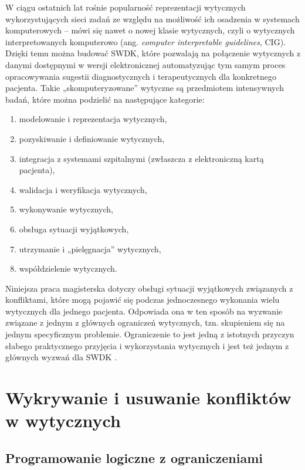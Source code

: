 W ciągu ostatnich lat rośnie popularność reprezentacji wytycznych wykorzystujących sieci zadań ze względu na możliwość ich osadzenia w systemach komputerowych -- mówi się nawet o nowej klasie wytycznych, czyli o wytycznych interpretowanych komputerowo (ang. \textit{computer interpretable guidelines}, CIG). Dzięki temu można budować SWDK, które pozwalają na połączenie wytycznych z danymi dostępnymi w wersji elektronicznej automatyzując tym samym proces opracowywania sugestii diagnostycznych i terapeutycznych dla konkretnego pacjenta. Takie „skomputeryzowane” wytyczne są przedmiotem intensywnych badań, które można podzielić na następujące kategorie:
\begin{enumerate}
\item modelowanie i reprezentacja wytycznych,
\item pozyskiwanie i definiowanie wytycznych,
\item integracja z systemami szpitalnymi (zwłaszcza z elektroniczną kartą pacjenta),
\item walidacja i weryfikacja wytycznych,
\item wykonywanie wytycznych,
\item obsługa sytuacji wyjątkowych,
\item utrzymanie i „pielęgnacja” wytycznych,
\item współdzielenie wytycznych.
\end{enumerate}

Niniejsza praca magisterska dotyczy obsługi sytuacji wyjątkowych związanych z konfliktami, które mogą pojawić się podczas jednoczesnego wykonania wielu wytycznych dla jednego pacjenta. Odpowiada ona w ten sposób na wyzwanie związane z jednym z głównych ograniczeń wytycznych, tzn. skupieniem się na jednym specyficznym problemie. Ograniczenie to jest jedną z istotnych przyczyn słabego praktycznego przyjęcia i wykorzystania wytycznych i jest też jednym z głównych wyzwań dla SWDK \cite{Sittig08}.

\section{Wykrywanie i usuwanie konfliktów w wytycznych}

\subsection{Programowanie logiczne z ograniczeniami}

